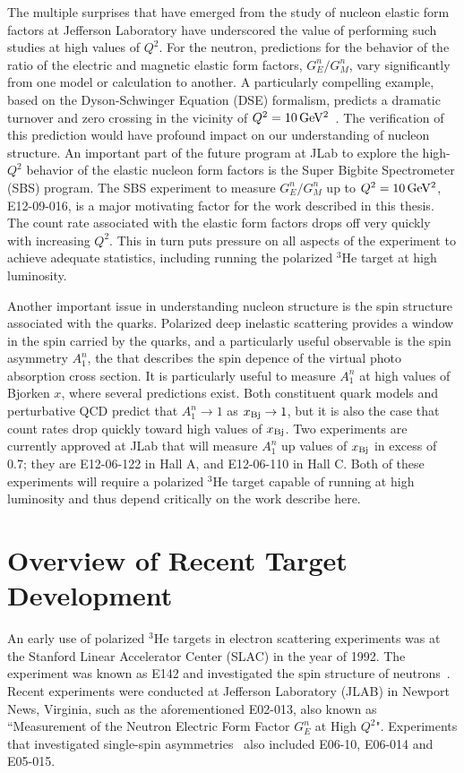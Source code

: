 The multiple surprises that have emerged from the study of nucleon elastic form factors at Jefferson Laboratory have underscored the value of performing such studies at high values of $Q^2$. For the neutron, predictions for the behavior of the ratio of the electric and magnetic elastic form factors, $G_E^n/G_M^n$, vary significantly from one model or calculation to another. A particularly compelling example, based on the Dyson-Schwinger Equation (DSE) formalism, predicts a dramatic turnover and zero crossing in the vicinity of $Q^2 = \rm 10\,GeV^2$~\cite{Cloet}. The verification of this prediction would have profound impact on our understanding of nucleon structure. An important part of the future program at JLab to explore the high-$Q^2$ behavior of the elastic nucleon form factors is the Super Bigbite Spectrometer (SBS) program. The SBS experiment to measure $G_E^n/G_M^n$ up to $Q^2 = \rm 10\,GeV^2$, E12-09-016, is a major motivating factor for the work described in this thesis. The count rate associated with the elastic form factors drops off very quickly with increasing $Q^2$. This in turn puts pressure on all aspects of the experiment to achieve adequate statistics, including running the polarized $^3$He target at high luminosity.  

Another important issue in understanding nucleon structure is the spin structure associated with the quarks. Polarized deep inelastic scattering provides a window in the spin carried by the quarks, and a particularly useful observable is the spin asymmetry $A_1^n$, the that describes the spin depence of the virtual photo absorption cross section. It is particularly useful to measure $A_1^n$ at high values of Bjorken $x$, where several predictions exist. Both constituent quark models and perturbative QCD predict that $A_1^n \rightarrow 1$ as $x_{\rm Bj} \rightarrow 1$, but it is also the case that count rates drop quickly toward high values of  $x_{\rm Bj}$. Two experiments are currently approved at JLab that will measure $A_1^n$ up values of  $x_{\rm Bj}$ in excess of 0.7; they are E12-06-122 in Hall A, and E12-06-110 in Hall C. Both of these experiments will require a polarized $^3$He target capable of running at high luminosity and thus depend critically on the work describe here.  

\section{Overview of Recent Target Development}

An early use of polarized $^3$He targets in electron scattering experiments was at the Stanford Linear Accelerator Center (SLAC) in the year of 1992. The experiment was known as E142 and investigated the spin structure of neutrons~\cite{PhysRevLett.71.959}. Recent experiments were conducted at Jefferson Laboratory (JLAB) in Newport News, Virginia, such as the aforementioned E02-013, also known as ``Measurement of the Neutron Electric Form Factor $G^n_E$ at High $Q^2$". Experiments that investigated single-spin asymmetries~\cite{Coulter} also included E06-10, E06-014 and E05-015. 

